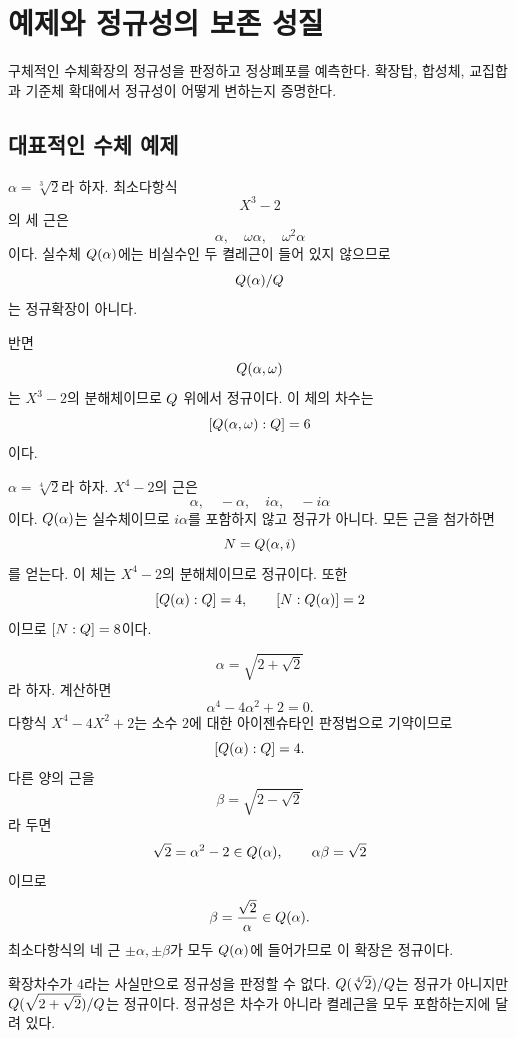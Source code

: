 \section{예제와 정규성의 보존 성질}
\label{sec:normal-examples-properties}

\begin{learninggoal}
구체적인 수체확장의 정규성을 판정하고 정상폐포를 예측한다. 확장탑, 합성체, 교집합과 기준체 확대에서 정규성이 어떻게 변하는지 증명한다.
\end{learninggoal}

\subsection{대표적인 수체 예제}

\begin{example}
$\alpha=\sqrt[3]{2}$라 하자. 최소다항식
\[
  X^3-2
\]
의 세 근은
\[
  \alpha,\quad \omega\alpha,\quad \omega^2\alpha
\]
이다. 실수체 $Q(\alpha)$에는 비실수인 두 켤레근이 들어 있지 않으므로
\[
  Q(\alpha)/Q
\]
는 정규확장이 아니다.

반면
\[
  Q(\alpha,\omega)
\]
는 $X^3-2$의 분해체이므로 $Q$ 위에서 정규이다. 이 체의 차수는
\[
  [Q(\alpha,\omega):Q]=6
\]
이다.
\end{example}

\begin{example}
$\alpha=\sqrt[4]{2}$라 하자. $X^4-2$의 근은
\[
  \alpha,\quad -\alpha,\quad i\alpha,\quad -i\alpha
\]
이다. $Q(\alpha)$는 실수체이므로 $i\alpha$를 포함하지 않고 정규가 아니다. 모든 근을 첨가하면
\[
  N=Q(\alpha,i)
\]
를 얻는다. 이 체는 $X^4-2$의 분해체이므로 정규이다. 또한
\[
  [Q(\alpha):Q]=4,
  \qquad
  [N:Q(\alpha)]=2
\]
이므로 $[N:Q]=8$이다.
\end{example}

\begin{example}
\[
  \alpha=\sqrt{2+\sqrt2}
\]
라 하자. 계산하면
\[
  \alpha^4-4\alpha^2+2=0.
\]
다항식 $X^4-4X^2+2$는 소수 $2$에 대한 아이젠슈타인 판정법으로 기약이므로
\[
  [Q(\alpha):Q]=4.
\]
다른 양의 근을
\[
  \beta=\sqrt{2-\sqrt2}
\]
라 두면
\[
  \sqrt2=\alpha^2-2\in Q(\alpha),
  \qquad
  \alpha\beta=\sqrt2
\]
이므로
\[
  \beta=\frac{\sqrt2}{\alpha}\in Q(\alpha).
\]
최소다항식의 네 근 $\pm\alpha,\pm\beta$가 모두 $Q(\alpha)$에 들어가므로 이 확장은 정규이다.
\end{example}

\begin{pitfall}
확장차수가 $4$라는 사실만으로 정규성을 판정할 수 없다. $Q(\sqrt[4]{2})/Q$는 정규가 아니지만 $Q(\sqrt{2+\sqrt2})/Q$는 정규이다. 정규성은 차수가 아니라 켤레근을 모두 포함하는지에 달려 있다.
\end{pitfall}

